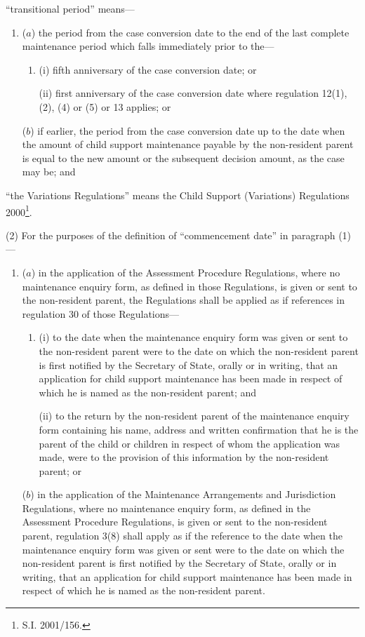\documentclass[12pt,a4paper]{article}
\begin{document}
\begin{enumerate}
“transitional period” means—
\begin{enumerate}\item[]
($a$) 
the period from the case conversion date to the end of the last complete maintenance period which falls immediately prior to the—
\begin{enumerate}\item[]
(i) 
fifth anniversary of the case conversion date; or

(ii) 
first anniversary of the case conversion date where regulation 12(1), (2), (4) or (5) or 13 applies; or
\end{enumerate}

($b$) 
if earlier, the period from the case conversion date up to the date when the amount of child support maintenance payable by the non-resident parent is equal to the new amount or the subsequent decision amount, as the case may be; and
\end{enumerate}

“the Variations Regulations” means the Child Support (Variations) Regulations 2000\footnote{\frenchspacing S.I. 2001/156.}.
\end{enumerate}

(2) For the purposes of the definition of “commencement date” in paragraph (1)—
\begin{enumerate}\item[]
($a$) in the application of the Assessment Procedure Regulations, where no maintenance enquiry form, as defined in those Regulations, is given or sent to the non-resident parent, the Regulations shall be applied as if references in regulation 30 of those Regulations—
\begin{enumerate}\item[]
(i) to the date when the maintenance enquiry form was given or sent to the non-resident parent were to the date on which the non-resident parent is first notified by the Secretary of State, orally or in writing, that an application for child support maintenance has been made in respect of which he is named as the non-resident parent; and

(ii) to the return by the non-resident parent of the maintenance enquiry form containing his name, address and written confirmation that he is the parent of the child or children in respect of whom the application was made, were to the provision of this information by the non-resident parent; or
\end{enumerate}

($b$) in the application of the Maintenance Arrangements and Jurisdiction Regulations, where no maintenance enquiry form, as defined in the Assessment Procedure Regulations, is given or sent to the non-resident parent, regulation 3(8) shall apply as if the reference to the date when the maintenance enquiry form was given or sent were to the date on which the non-resident parent is first notified by the Secretary of State, orally or in writing, that an application for child support maintenance has been made in respect of which he is named as the non-resident parent.
\end{enumerate}
\end{document}
